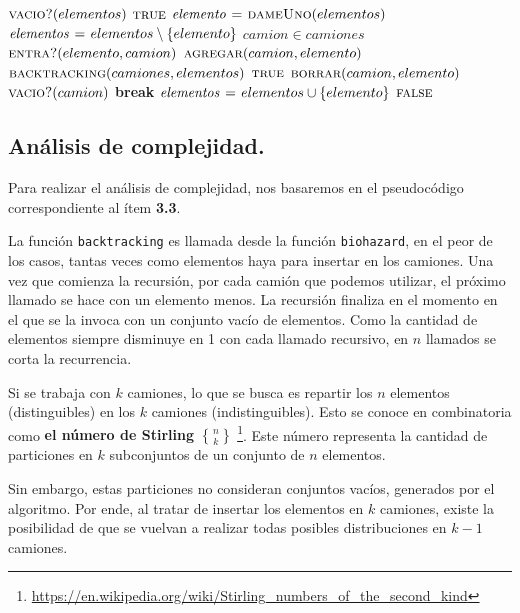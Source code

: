 \vspace*{0.5cm}


\begin{codebox}
\li \If $\textnormal{\scshape vacio?}(elementos)$ \Then
\li   \Return $\textnormal{\scshape true}$
    \End
\li $\id{elemento} \gets \proc{dameUno}(elementos)$
\li $\id{elementos} \gets elementos \setminus \{elemento\}$
\li \For $camion \in camiones$ \Do
\li   \If $\textnormal{\scshape entra?}(elemento, camion)$ \Then
\li     $\textnormal{\scshape agregar}(camion, elemento)$
\li     \If $\textnormal{\scshape backtracking}(camiones, elementos)$ \Then
\li       \Return $\textnormal{\scshape true}$
\li     \Else
\li       $\textnormal{\scshape borrar}(camion, elemento)$
\li       \If $\textnormal{\scshape vacio?}(camion)$ \Then
\li         \textbf{break}
          \End
        \End
      \End
    \End
\li $\id{elementos} \gets elementos \cup \{elemento\}$
\li \Return $\textnormal{\scshape false}$
\end{codebox}



\newpage
\subsection{Análisis de complejidad.}

\vspace*{0.3cm}

Para realizar el análisis de complejidad, nos basaremos en el pseudocódigo
correspondiente al ítem \textbf{3.3}.

La función \verb|backtracking| es llamada desde la función \verb|biohazard|,
en el peor de los casos, tantas veces como elementos haya para insertar en
los camiones. Una vez que comienza la recursión, por cada camión que podemos
utilizar, el próximo llamado se hace con un elemento menos. La recursión
finaliza en el momento en el que se la invoca con un conjunto vacío de
elementos. Como la cantidad de elementos siempre disminuye en 1 con cada
llamado recursivo, en $n$ llamados se corta la recurrencia.

Si se trabaja con $k$ camiones, lo que se busca es repartir los $n$
elementos (distinguibles) en los $k$ camiones (indistinguibles). Esto se
conoce en combinatoria como \textbf{el número de Stirling ${n \brace k}$}
\footnote{\url{https://en.wikipedia.org/wiki/Stirling_numbers_of_the_second_kind}}.
Este número representa la cantidad de
particiones en $k$ subconjuntos de un conjunto de $n$ elementos.

Sin embargo, estas particiones no consideran conjuntos vacíos, generados por
el algoritmo. Por ende, al tratar de insertar los elementos en $k$ camiones,
existe la posibilidad de que se vuelvan a realizar todas posibles
distribuciones en $k - 1$ camiones.

